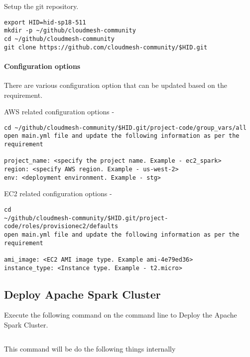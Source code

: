 Setup the git repository.

\begin{verbatim}
export HID=hid-sp18-511
mkdir -p ~/github/cloudmesh-community
cd ~/github/cloudmesh-community
git clone https://github.com/cloudmesh-community/$HID.git
\end{verbatim}


\paragraph{Configuration options}

There are various configuration option that can be updated based on
the requirement.

AWS related configuration options -

\begin{verbatim}
cd ~/github/cloudmesh-community/$HID.git/project-code/group_vars/all
open main.yml file and update the following information as per the
requirement

project_name: <specify the project name. Example - ec2_spark>
region: <specify AWS region. Example - us-west-2>
env: <deployment environment. Example - stg>
\end{verbatim}

EC2 related configuration options -

\begin{verbatim}
cd
~/github/cloudmesh-community/$HID.git/project-code/roles/provisionec2/defaults
open main.yml file and update the following information as per the
requirement
 
ami_image: <EC2 AMI image type. Example ami-4e79ed36>
instance_type: <Instance type. Example - t2.micro>
\end{verbatim}

\subsection{Deploy Apache Spark Cluster}

Execute the following command on the command line to Deploy the Apache
Spark Cluster.

\begin{verbatim}

\end{verbatim}

This command will be do the following things internally 

